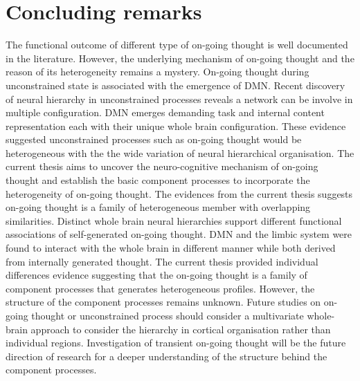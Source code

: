 \section{Concluding remarks}
\label{ch:discussion:summary}
The functional outcome of different type of on-going thought is well documented in the literature. However, the underlying mechanism of on-going thought and the reason of its heterogeneity remains a mystery. On-going thought during unconstrained state is associated with the emergence of DMN. Recent discovery of neural hierarchy in unconstrained processes reveals a network can be involve in multiple configuration. DMN emerges demanding task and internal content representation each with their unique whole brain configuration. These evidence suggested unconstrained processes such as on-going thought would be heterogeneous with the the wide variation of neural hierarchical organisation. The current thesis aims to uncover the neuro-cognitive mechanism of on-going thought and establish the basic component processes to incorporate the heterogeneity of on-going thought. The evidences from the current thesis suggests on-going thought is a family of heterogeneous member with overlapping similarities. Distinct whole brain neural hierarchies support different functional associations of self-generated on-going thought. DMN and the limbic system were found to interact with the whole brain in different manner while both derived from internally generated thought. The current thesis provided individual differences evidence suggesting that the on-going thought is a family of component processes that generates heterogeneous profiles. However, the structure of the component processes remains unknown. Future studies on on-going thought or unconstrained process should consider a multivariate whole-brain approach to consider the hierarchy in cortical organisation rather than individual regions. Investigation of transient on-going thought will be the future direction of research for a deeper understanding of the structure behind the component processes. 